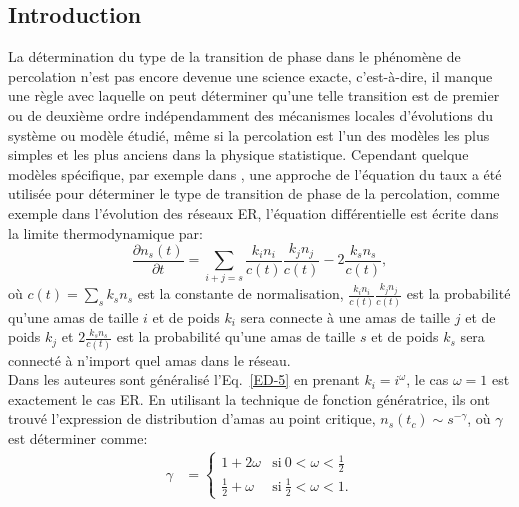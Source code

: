 \subsection{Introduction}
La détermination du type de la transition de phase dans le phénomène de percolation n'est pas encore devenue une science exacte, c'est-à-dire, il manque une règle avec laquelle on peut déterminer qu'une telle transition est de premier ou de deuxième ordre indépendamment des mécanismes locales d'évolutions du système ou modèle étudié, même si la percolation est l'un des modèles les plus simples et les plus anciens dans la physique statistique. Cependant quelque modèles spécifique, par exemple dans \cite{Ziff-al1983}, une approche de l'équation du taux a été utilisée pour déterminer le type de transition de phase de la percolation, comme exemple dans l'évolution des réseaux ER, l'équation différentielle est écrite dans la limite thermodynamique par:
\begin{equation}
\frac{\partial n_s(t)}{\partial t}=\sum_{i+j=s}\frac{k_in_i}{c(t)}\frac{k_jn_j}{c(t)}-2\frac{k_sn_s}{c(t)},
\label{ED-5}
\end{equation}
où $c(t)=\sum_{s}k_sn_s$ est la constante de normalisation, $\frac{k_in_i}{c(t)}\frac{k_jn_j}{c(t)}$ est la probabilité qu'une amas de taille $i$ et de poids $k_i$ sera connecte à une amas de taille $j$ et de poids $k_j$ et $2\frac{k_sn_s}{c(t)}$ est la probabilité qu'une amas de taille $s$ et de poids $k_s$ sera connecté à n'import quel amas dans le réseau.\\
Dans \cite{Cho-al2010,Cho2-Kahng2011} les auteures sont généralisé l'Eq.~\eqref{ED-5} en prenant $k_i=i^{\omega}$, le cas $\omega=1$ est exactement le cas ER. En utilisant la technique de fonction génératrice, ils ont trouvé l'expression de distribution d'amas au point critique, $n_s(t_c)\sim s^{-\gamma}$, où $\gamma$ est déterminer comme:
\begin{align}
\gamma &=
\begin{cases}
1+2\omega & \text{si}\ 0<\omega<\frac{1}{2} \\
 \frac{1}{2}+\omega& \text{si}\ \frac{1}{2}<\omega<1.
\end{cases}
\label{gama}
\end{align}

